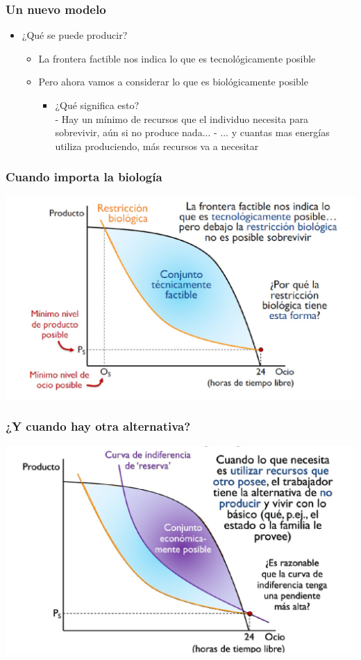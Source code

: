\documentclass{beamer}
\begin{document}
\begin{frame}
\frametitle{Un nuevo modelo}
\begin{itemize}
    \item ¿Qué se puede producir? \vspace{2mm}
        \begin{itemize}
        \item La frontera factible nos indica lo que es tecnológicamente posible \vspace{2mm}
        \item Pero ahora vamos a considerar lo que es biológicamente posible
        \begin{itemize} \vspace{2mm}
            \item ¿Qué significa esto? \\
            - Hay un mínimo de recursos que el individuo necesita para sobrevivir, aún si no produce nada...
            - ... y cuantas mas energías utiliza produciendo, más recursos va a necesitar
        \end{itemize}
    \end{itemize}
\end{itemize}
\end{frame}

\begin{frame}
\frametitle{ Cuando importa la biología}
\centering
\includegraphics[scale=0.3]{Figures/Tema_04.4_tecnoybiologia.jpg}
\end{frame}

\begin{frame}
\frametitle{¿Y cuando hay otra alternativa?}
\centering
\includegraphics[scale=0.3]{Figures/Tema_04.10_modcap4_5.jpg}
\end{frame}
\end{document}
